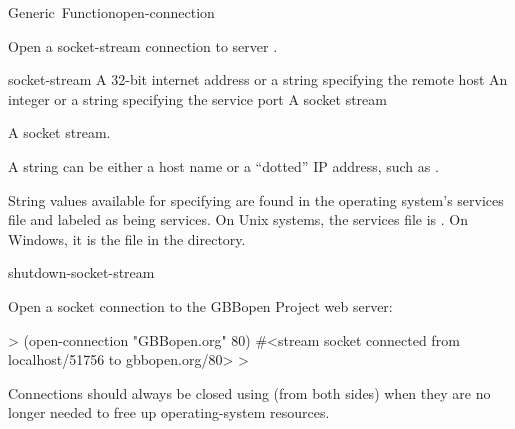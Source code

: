 \documentclass[10pt,twoside,english,pdftex]{article}
\begin{document}
\begin{functiondoc}{Generic~Function}{open-connection}{
    }
%
%
%

\fnsyntax

\fnpurpose Open a socket-stream connection to server .

\fnmethods
{}

\fnpackage {}

\fnmodule {}

\fnargs
\begin{args}{socket-stream}
\arg[host] A 32-bit internet address or a string specifying the remote host
\arg[port] An integer or a string specifying the service port
 A socket stream
\end{args}

\fnreturns A socket stream.

\fndescription A  string can be either a host name or a
``dotted'' IP address, such as .

String values available for specifying  are found in the operating
system's services file and labeled as being  services. On Unix
systems, the services file is . On Windows, it is
the file  in the  directory.

\begin{alsos}{shutdown-socket-stream}
\end{alsos}

\fnexample
Open a socket connection to the GBBopen Project web server:
%
\W\supp
\begin{example}
  > (open-connection "GBBopen.org" 80)
  #<stream socket connected from localhost/51756 to gbbopen.org/80>
  >
\end{example}

\fnnote Connections should always be closed using  (from
both sides) when they are no longer needed to free up operating-system
resources.

\end{functiondoc}
\end{document}
